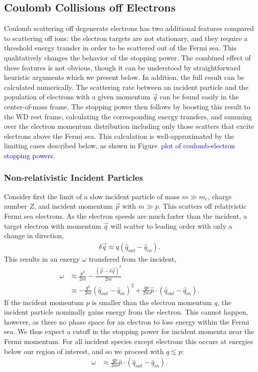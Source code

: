 \documentclass[preprintnumbers,amsmath,amssymb,prd, superscriptaddress,twocolumn]{revtex4}
\begin{document}
\begin{appendices}
\subsection{Coulomb Collisions off Electrons}

Coulomb scattering off degenerate electrons has two additional features compared to scattering off ions: the electron targets are not stationary, and they require a threshold energy transfer in order to be scattered out of the Fermi sea.
This qualitatively changes the behavior of the stopping power.
The combined effect of these features is not obvious, though it can be understood by straightforward heuristic arguments which we present below.
In addition, the full result can be calculated numerically.
The scattering rate between an incident particle and the population of electrons with a given momentum $\vec{q}$ can be found easily in the center-of-mass frame.
The stopping power then follows by boosting this result to the WD rest frame, calculating the corresponding energy transfers, and summing over the electron momentum distribution including only those scatters that excite electrons above the Fermi sea.
This calculation is well-approximated by the limiting cases described below, as shown in Figure~\textcolor{blue}{plot of coulomb-electron stopping powers}.

\subsubsection{Non-relativistic Incident Particles}
Consider first the limit of a slow incident particle of mass $m \gg m_e$, charge number $Z$, and incident momentum $\vec{p}$ with $m \gg p$.
This scatters off relativistic Fermi sea electrons.
As the electron speeds are much faster than the incident, a target electron with momentum $\vec{q}$ will scatter to leading order with only a change in direction,
\begin{align}
  \delta \vec{q} \approx q \left(\hat{q}_{out} - \hat{q}_{in}\right).
\end{align}
This results in an energy $\omega$ transfered from the incident,
\begin{align}
  \omega &\approx \frac{p^2}{2 m} -
    \frac{\left(\vec{p} - \delta \vec{q}\right)^2}{2 m} \\
    &\approx -\frac{q^2}{2m}  \left(\hat{q}_{out} - \hat{q}_{in}\right)^2
  + \frac{q p}{2m} \hat{p} \cdot \left(\hat{q}_{out} - \hat{q}_{in}\right).
\end{align}
If the incident momentum $p$ is smaller than the electron momentum $q$, the incident particle nominally gains energy from the electron.
This cannot happen, however, as there no phase space for an electron to lose energy within the Fermi sea.
We thus expect a cutoff in the stopping power for incident momenta near the Fermi momentum.
For all incident species except electrons this occurs at energies below our region of interest, and so we proceed with $q \lesssim p$:
\begin{align}
  \omega &\approx \frac{q p}{2m}
  \hat{p} \cdot \left(\hat{q}_{out} - \hat{q}_{in}\right).
\end{align}


\end{appendices}
\end{document}
